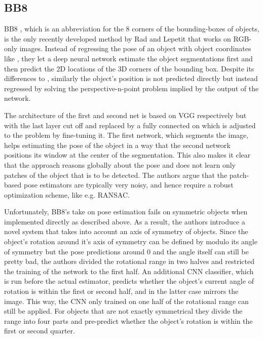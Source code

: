 \subsection{BB8}

BB8 \cite{bb8}, which is an abbreviation for the 8 corners of the bounding-boxes of objects, is the only recently developed method by Rad and Lepetit that works on RGB-only images. Instead of regressing the pose of an object with object coordinates like \cite{brachmann1}, they let a deep neural network estimate the object segmentations first and then predict the 2D locations of the 3D corners of the bounding box. Despite its differences to \cite{brachmann1}, similarly the object's position is not predicted directly but instead regressed by solving the perspective-n-point problem implied by the output of the network. 

The architecture of the first and second net is based on VGG respectively but with the last layer cut off and replaced by a fully connected on which is adjusted to the problem by fine-tuning it. The first network, which segments the image, helps estimating the pose of the object in a way that the second network positions its window at the center of the segmentation. This also makes it clear that the approach reasons globally about the pose and does not learn only patches of the object that is to be detected. The authors argue that the patch-based pose estimators are typically very noisy, and hence require a robust optimization scheme, like e.g. RANSAC. 

Unfortunately, BB8's take on pose estimation fails on symmetric objects when implemented directly as described above. As a result, the authors introduce a novel system that takes into account an axis of symmetry of objects. Since the object's rotation around it's axis of symmetry can be defined by modulo its angle of symmetry but the pose predictions around 0 and the angle itself can still be pretty bad, the authors divided the rotational range in two halves and restricted the training of the network to the first half. An additional CNN classifier, which is run before the actual estimator, predicts whether the object's current angle of rotation is within the first or second half, and in the latter case mirrors the image. This way, the CNN only trained on one half of the rotational range can still be applied. For objects that are not exactly symmetrical they divide the range into four parts and pre-predict whether the object's rotation is within the first or second quarter. 


